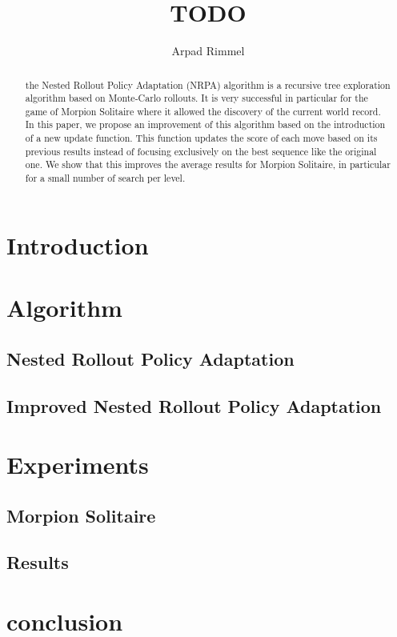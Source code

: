 \documentclass{llncs}
\begin{document}
\title{TODO}
%
%
\author{Arpad Rimmel }
%

\maketitle              %

\begin{abstract}
    the Nested Rollout Policy Adaptation (NRPA) algorithm is a recursive tree exploration algorithm based on Monte-Carlo rollouts. 
    It is very successful in particular for the game of Morpion Solitaire where it allowed the discovery of the current world record.
    In this paper, we propose an improvement of this algorithm based on the introduction of a new update function. 
    This function updates the score of each move based on its previous results instead of focusing exclusively on the best sequence like the original one.
    We show that this improves the average results for Morpion Solitaire, in particular for a small number of search per level.
\end{abstract}

\section{Introduction}




\section{Algorithm}\label{algo}

\subsection{Nested Rollout Policy Adaptation}\label{NRPA}


\subsection{Improved Nested Rollout Policy Adaptation}\label{INRPA}


\section{Experiments}\label{xp}
\subsection{Morpion Solitaire}

\subsection{Results}


\section{conclusion}



\end{document}
